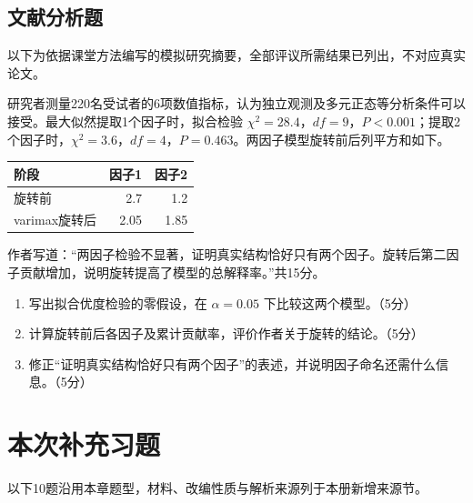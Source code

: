 \par\addvspace{6pt}\noindent\begin{minipage}{\linewidth}

\subsection{文献分析题}


以下为依据课堂方法编写的模拟研究摘要，全部评议所需结果已列出，不对应真实论文。

研究者测量220名受试者的6项数值指标，认为独立观测及多元正态等分析条件可以接受。最大似然提取1个因子时，拟合检验 \(\chi^2=28.4\)，\(df=9\)，\(P<0.001\)；提取2个因子时，\(\chi^2=3.6\)，\(df=4\)，\(P=0.463\)。两因子模型旋转前后列平方和如下。

\begin{center}\small\setlength{\tabcolsep}{4pt}\renewcommand{\arraystretch}{1.18}\begin{tabular}{@{}lrr@{}}
\toprule
阶段 & 因子1 & 因子2 \\
\midrule

旋转前 & 2.7 & 1.2 \\
varimax旋转后 & 2.05 & 1.85 \\
\bottomrule\end{tabular}\end{center}

作者写道：``两因子检验不显著，证明真实结构恰好只有两个因子。旋转后第二因子贡献增加，说明旋转提高了模型的总解释率。''共15分。

\begin{enumerate}
\def\labelenumi{\arabic{enumi}.}
\tightlist
\item
  写出拟合优度检验的零假设，在 \(\alpha=0.05\) 下比较这两个模型。（5分）
\item
  计算旋转前后各因子及累计贡献率，评价作者关于旋转的结论。（5分）
\item
  修正``证明真实结构恰好只有两个因子''的表述，并说明因子命名还需什么信息。（5分）
\end{enumerate}



\end{minipage}\par\vspace{4pt}
\clearpage\section{本次补充习题}
以下10题沿用本章题型，材料、改编性质与解析来源列于本册新增来源节。


